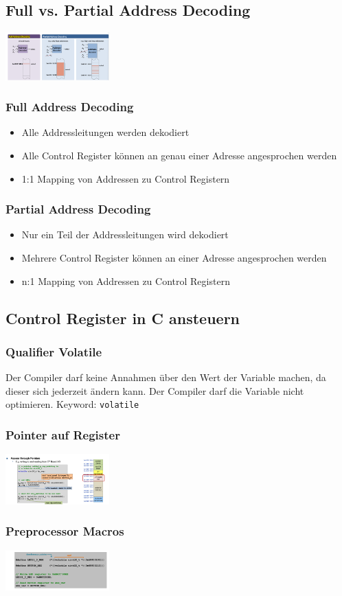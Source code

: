 \subsection{Full vs. Partial Address Decoding}
\includegraphics[width=0.3\textwidth]{sections/images/full_partial_address_decoding.png}
\subsubsection{Full Address Decoding}
\begin{itemize}
    \item Alle Addressleitungen werden dekodiert
    \item Alle Control Register können an genau einer Adresse angesprochen werden
    \item 1:1 Mapping von Addressen zu Control Registern
\end{itemize}
\subsubsection{Partial Address Decoding}
\begin{itemize}
    \item Nur ein Teil der Addressleitungen wird dekodiert
    \item Mehrere Control Register können an einer Adresse angesprochen werden
    \item n:1 Mapping von Addressen zu Control Registern
\end{itemize}

\subsection{Control Register in C ansteuern}
\subsubsection{Qualifier Volatile}
Der Compiler darf keine Annahmen über den Wert der Variable machen, da dieser sich jederzeit ändern kann. Der Compiler darf die Variable nicht optimieren. Keyword: \texttt{volatile}
\subsubsection{Pointer auf Register}
\includegraphics[width=0.3\textwidth]{sections/images/pointer_c.png}
\subsubsection{Preprocessor Macros}
\includegraphics[width=0.3\textwidth]{sections/images/preprocessor_c.png}